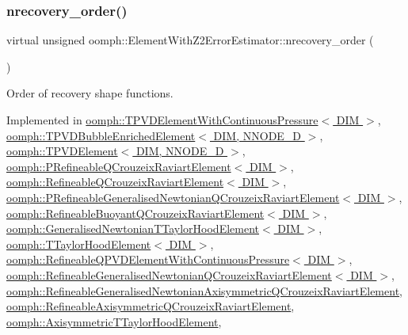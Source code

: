 \subsubsection{\texorpdfstring{nrecovery\+\_\+order()}{nrecovery\_order()}}
{\footnotesize\ttfamily virtual unsigned oomph\+::\+Element\+With\+Z2\+Error\+Estimator\+::nrecovery\+\_\+order (\begin{DoxyParamCaption}{ }\end{DoxyParamCaption})\hspace{0.3cm}{\ttfamily [pure virtual]}}



Order of recovery shape functions. 



Implemented in \hyperlink{classoomph_1_1TPVDElementWithContinuousPressure_ad2fac6714b3a38e66c4e2e837870cff7}{oomph\+::\+T\+P\+V\+D\+Element\+With\+Continuous\+Pressure$<$ D\+I\+M $>$}, \hyperlink{classoomph_1_1TPVDBubbleEnrichedElement_a865b7401a12a822e3d24c58f7418fb97}{oomph\+::\+T\+P\+V\+D\+Bubble\+Enriched\+Element$<$ D\+I\+M, N\+N\+O\+D\+E\+\_\+D $>$}, \hyperlink{classoomph_1_1TPVDElement_a85176c5881f61e045e9783460ca0064f}{oomph\+::\+T\+P\+V\+D\+Element$<$ D\+I\+M, N\+N\+O\+D\+E\+\_\+D $>$}, \hyperlink{classoomph_1_1PRefineableQCrouzeixRaviartElement_a8a4bf8ba2d89273431c78ea5e09e0947}{oomph\+::\+P\+Refineable\+Q\+Crouzeix\+Raviart\+Element$<$ D\+I\+M $>$}, \hyperlink{classoomph_1_1RefineableQCrouzeixRaviartElement_a623aa5e918f7e6acfee3107de07f4afb}{oomph\+::\+Refineable\+Q\+Crouzeix\+Raviart\+Element$<$ D\+I\+M $>$}, \hyperlink{classoomph_1_1PRefineableGeneralisedNewtonianQCrouzeixRaviartElement_a0031a3c03dd28974a552fdc9de0ff6c5}{oomph\+::\+P\+Refineable\+Generalised\+Newtonian\+Q\+Crouzeix\+Raviart\+Element$<$ D\+I\+M $>$}, \hyperlink{classoomph_1_1RefineableBuoyantQCrouzeixRaviartElement_a18e7035500add323a8d5ce921c9c1b8a}{oomph\+::\+Refineable\+Buoyant\+Q\+Crouzeix\+Raviart\+Element$<$ D\+I\+M $>$}, \hyperlink{classoomph_1_1GeneralisedNewtonianTTaylorHoodElement_af02e0f6528abd5e17aceceb96811fe25}{oomph\+::\+Generalised\+Newtonian\+T\+Taylor\+Hood\+Element$<$ D\+I\+M $>$}, \hyperlink{classoomph_1_1TTaylorHoodElement_a132c8f850554a160cdc8d2afecb26b3a}{oomph\+::\+T\+Taylor\+Hood\+Element$<$ D\+I\+M $>$}, \hyperlink{classoomph_1_1RefineableQPVDElementWithContinuousPressure_aa0689547ae0239df24c07a985e891a16}{oomph\+::\+Refineable\+Q\+P\+V\+D\+Element\+With\+Continuous\+Pressure$<$ D\+I\+M $>$}, \hyperlink{classoomph_1_1RefineableGeneralisedNewtonianQCrouzeixRaviartElement_a6a5c45a61f21c73dd72bce3adf0ebd07}{oomph\+::\+Refineable\+Generalised\+Newtonian\+Q\+Crouzeix\+Raviart\+Element$<$ D\+I\+M $>$}, \hyperlink{classoomph_1_1RefineableGeneralisedNewtonianAxisymmetricQCrouzeixRaviartElement_adf4666579138c21a202b3d55332dbb6e}{oomph\+::\+Refineable\+Generalised\+Newtonian\+Axisymmetric\+Q\+Crouzeix\+Raviart\+Element}, \hyperlink{classoomph_1_1RefineableAxisymmetricQCrouzeixRaviartElement_a644f9d24915f1fb952b8746581f69ee3}{oomph\+::\+Refineable\+Axisymmetric\+Q\+Crouzeix\+Raviart\+Element}, \hyperlink{classoomph_1_1AxisymmetricTTaylorHoodElement_a2cd7e8c1aafe58b6cc36eef0b201b9f2}{oomph\+::\+Axisymmetric\+T\+Taylor\+Hood\+Element}, 